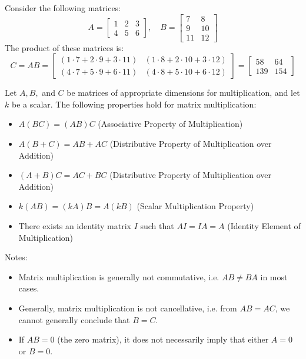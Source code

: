 \begin{eg}
    Consider the following matrices:
    \[
        A = 
        \begin{bmatrix}
            1 & 2 & 3 \\
            4 & 5 & 6
        \end{bmatrix}
        , \quad
        B = 
        \begin{bmatrix}
            7 & 8 \\
            9 & 10 \\
            11 & 12
        \end{bmatrix}
    \]
    The product of these matrices is:
    \[
        C = AB = 
        \begin{bmatrix}
            (1 \cdot 7 + 2 \cdot 9 + 3 \cdot 11) & (1 \cdot 8 + 2 \cdot 10 + 3 \cdot 12) \\
            (4 \cdot 7 + 5 \cdot 9 + 6 \cdot 11) & (4 \cdot 8 + 5 \cdot 10 + 6 \cdot 12)
        \end{bmatrix}
        =
        \begin{bmatrix}
            58 & 64 \\
            139 & 154
        \end{bmatrix}
    \]
\end{eg}
\begin{theorem}
    Let \( A, B, \) and \( C \) be matrices of appropriate dimensions for multiplication, and let \( k \) be a scalar. The following properties hold for matrix multiplication:
    \begin{itemize}[itemsep=1pt,label=$\circ$]
        \item \( A(BC) = (AB)C \) (Associative Property of Multiplication)
        \item \( A(B + C) = AB + AC \) (Distributive Property of Multiplication over Addition)
        \item \( (A + B)C = AC + BC \) (Distributive Property of Multiplication over Addition)
        \item \( k(AB) = (kA)B = A(kB) \) (Scalar Multiplication Property)
        \item There exists an identity matrix \( I \) such that \( AI = IA = A \) (Identity Element of Multiplication)
    \end{itemize}
\end{theorem}
Notes:
\begin{itemize}[itemsep=1pt,label=$\circ$]
    \item Matrix multiplication is generally not commutative, i.e. \( AB \neq BA \) in most cases.
    \item Generally, matrix multiplication is not cancellative, i.e. from \( AB = AC \), we cannot generally conclude that \( B = C \).
    \item If \( AB = 0 \) (the zero matrix), it does not necessarily imply that either \( A = 0 \) or \( B = 0 \).
\end{itemize}
